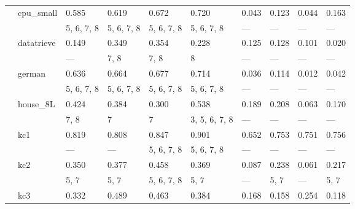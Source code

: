 \documentclass{article}
\begin{document}
\begin{center}
\begin{longtable}{p{1.2cm}p{1.8cm}p{1cm}p{1cm}p{1cm}p{1cm}p{1cm}p{1cm}p{1cm}p{1cm}}
             & cpu\_small    & 0.585            & 0.619         & 0.672         & 0.720         & 0.043         & 0.123      & 0.044            & 0.163         \\
             &              & 5, 6, 7, 8       & 5, 6, 7, 8    & 5, 6, 7, 8    & 5, 6, 7, 8    & ---           & ---        & ---              & ---           \\
             & datatrieve   & 0.149            & 0.349         & 0.354         & 0.228         & 0.125         & 0.128      & 0.101            & 0.020         \\
             &              & ---              & 7, 8          & 7, 8          & 8             & ---           & ---        & ---              & ---           \\
             & german       & 0.636            & 0.664         & 0.677         & 0.714         & 0.036         & 0.114      & 0.012            & 0.042         \\
             &              & 5, 6, 7, 8       & 5, 6, 7, 8    & 5, 6, 7, 8    & 5, 6, 7, 8    & ---           & ---        & ---              & ---           \\
             & house\_8L     & 0.424            & 0.384         & 0.300         & 0.538         & 0.189         & 0.208      & 0.063            & 0.170         \\
             &              & 7, 8             & 7             & 7             & 3, 5, 6, 7, 8 & ---           & ---        & ---              & ---           \\
             & kc1          & 0.819            & 0.808         & 0.847         & 0.901         & 0.652         & 0.753      & 0.751            & 0.756         \\
             &              & ---              & ---           & 5, 6, 7, 8    & 5, 6, 7, 8    & ---           & ---        & ---              & ---           \\
             & kc2          & 0.350            & 0.377         & 0.458         & 0.369         & 0.087         & 0.238      & 0.061            & 0.217         \\
             &              & 5, 7             & 5, 7          & 5, 6, 7, 8    & 5, 7          & ---           & 5, 7       & ---              & 5, 7          \\
             & kc3          & 0.332            & 0.489         & 0.463         & 0.384         & 0.168         & 0.158      & 0.254            & 0.118         \\

\end{longtable}
\end{center}
\end{document}
